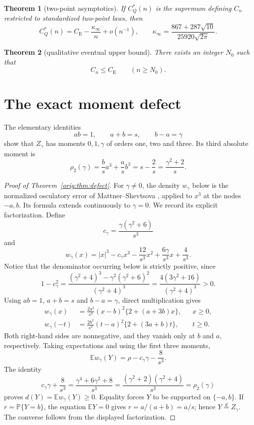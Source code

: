\documentclass[11pt,a4paper]{article}
\numberwithin{equation}{section}
\newtheorem{theorem}{Theorem}[section]
\theoremstyle{definition}
\theoremstyle{remark}
\newcommand{\E}{\mathbb E}
\newcommand{\Pp}{\mathbb P}
\newcommand{\CE}{C_{\mathrm E}}
\begin{document}
\begin{theorem}[two-point asymptotics]\label{orig:thm:twopoint}
If $C_Q^*(n)$ is the supremum defining $C_n$ restricted to standardized
two-point laws, then
\[
 C_Q^*(n)=\CE-\frac{\kappa_\infty}{n}+o(n^{-1}),
 \qquad
 \kappa_\infty=\frac{867+287\sqrt{10}}
 {25920\sqrt{2\pi}}.
\]
\end{theorem}

\begin{theorem}[qualitative eventual upper bound]\label{orig:thm:eventual}
There exists an integer $N_0$ such that
\[
 C_n\le\CE\qquad(n\ge N_0).
\]
\end{theorem}


\section{The exact moment defect}\label{orig:sec:defect}

The elementary identities
\[
 ab=1,\qquad a+b=s,\qquad b-a=\gamma
\]
show that $Z_\gamma$ has moments $0,1,\gamma$ of orders one, two and
three.  Its third absolute moment is
\[
 \rho_2(\gamma)=\frac{b}{s}a^3+\frac{a}{s}b^3
 =s-\frac2s=\frac{\gamma^2+2}{s}.
\]

\begin{proof}[Proof of Theorem~\ref{orig:thm:defect}]
For $\gamma\ne0$, the density $w_\gamma$ below is the normalized
osculatory error of Mattner--Shevtsova
\cite[Lemma~2.4(b)]{MattnerShevtsova2019}, applied to $x^3$ at the
nodes $-a,b$. Its formula extends continuously to $\gamma=0$.
We record its explicit factorization.
Define
\[
 c_\gamma=\frac{\gamma(\gamma^2+6)}{s^3}
\]
and
\[
 w_\gamma(x)=|x|^3-c_\gamma x^3-\frac{12}{s^3}x^2
              +\frac{6\gamma}{s^3}x+\frac4{s^3}.
\]
Notice that the denominator occurring below is strictly positive, since
\[
 1-c_\gamma^2
 =\frac{(\gamma^2+4)^3-\gamma^2(\gamma^2+6)^2}
        {(\gamma^2+4)^3}
 =\frac{4(3\gamma^2+16)}{(\gamma^2+4)^3}>0.
\]
Using $ab=1$, $a+b=s$ and $b-a=\gamma$, direct multiplication gives
\begin{align}
 w_\gamma(x)
 &=\frac{2a^2}{s^3}(x-b)^2\{2+(a+3b)x\},&&x\ge0,\label{orig:eq:wplus}\\
 w_\gamma(-t)
 &=\frac{2b^2}{s^3}(t-a)^2\{2+(3a+b)t\},&&t\ge0.\label{orig:eq:wminus}
\end{align}
Both right-hand sides are nonnegative, and they vanish only at $b$ and
$a$, respectively.  Taking expectations and using the first three moments,
\[
 \E w_\gamma(Y)=\rho-c_\gamma\gamma-\frac8{s^3}.
\]
The identity
\[
 c_\gamma\gamma+\frac8{s^3}
 =\frac{\gamma^4+6\gamma^2+8}{s^3}
 =\frac{(\gamma^2+2)(\gamma^2+4)}{s^3}
 =\rho_2(\gamma)
\]
proves $d(Y)=\E w_\gamma(Y)\ge0$.  Equality forces $Y$ to be supported
on $\{-a,b\}$.  If $r=\Pp\{Y=b\}$, the equation $\E Y=0$ gives
$r=a/(a+b)=a/s$; hence $Y\stackrel d=Z_\gamma$.  The converse follows
from the displayed factorization.
\end{proof}
\end{document}
